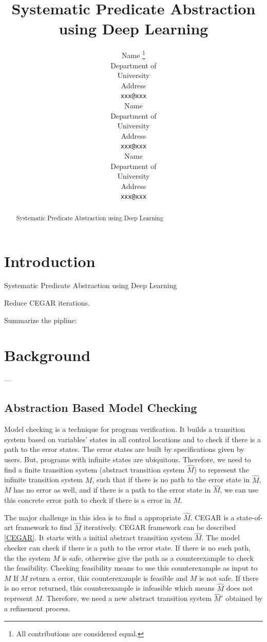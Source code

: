 \documentclass{article}
\title{Systematic Predicate Abstraction using Deep Learning}
\author{
  Name \thanks{All contributions are considered equal.}\\
  Department of \\
   University\\
  Address \\
  \texttt{xxx@xxx} \\
   \And
 Name \samethanks\\
  Department of \\
   University\\
  Address \\
  \texttt{xxx@xxx} \\
     \And
 Name \samethanks\\
  Department of \\
   University\\
  Address \\
  \texttt{xxx@xxx} \\
}
\begin{document}
\maketitle

\begin{abstract}
Systematic Predicate Abstraction using Deep Learning
\end{abstract}




\section{Introduction}
Systematic Predicate Abstraction using Deep Learning

Reduce CEGAR iterations.

Summarize the pipline:

\section{Background}
---
\subsection{Abstraction Based Model Checking}
Model checking is a technique for program verification. It builds a transition system based on variables' states in all control locations and to check if there is a path to the error states. The error states are built by specifications given by users. But, programs with infinite states are ubiquitous. Therefore, we need to find a finite transition system (abstract transition system $\widehat{M}$) to represent the infinite transition system $M$, such that if there is no path to the error state in $\widehat{M}$, $M$ has no error as well, and if there is a path to the error state in $\widehat{M}$, we can use this concrete error path to check if there is a error in $M$.

The major challenge in this idea is to find a appropriate $\widehat{M}$. CEGAR \cite{10.1007/10722167_15} is a state-of-art framework to find $\widehat{M}$ iteratively. CEGAR framework can be described \ref{CEGAR}. It starts with a initial abstract transition system $\widehat{M}$. The model checker can check if there is a path to the error state. If there is no such path, the the system $M$ is safe, otherwise give the path as a counterexample to check the feasibility. Checking feasibility means to use this counterexample as input to $M$ If $M$ return a error, this counterexample is feasible and $M$ is not safe. If there is no error returned, this counterexample is infeasible which means $\widehat{M}$ does not represent $M$. Therefore, we need a new abstract transition system $\widehat{M}'$ obtained by a refinement process.
\end{document}
